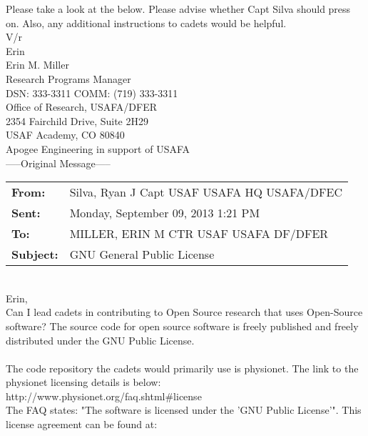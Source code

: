 \documentclass[10pt]{article}
\begin{document}
Please take a look at the below. Please advise whether Capt Silva should press on. Also, any additional instructions to cadets would be helpful. \\

V/r \\

Erin \\

\noindent Erin M. Miller \\
Research Programs Manager \\
DSN: 333-3311 COMM: (719) 333-3311 \\
Office of Research, USAFA/DFER \\
2354 Fairchild Drive, Suite 2H29 \\
USAF Academy, CO 80840 \\
Apogee Engineering in support of USAFA \\
\newpage
\noindent-----Original Message----- \\

\noindent \begin{tabu} to \textwidth{l X[l]}
 
  \textbf{From:} & Silva, Ryan J Capt USAF USAFA HQ USAFA/DFEC  \\
  \textbf{Sent:} & Monday, September 09, 2013 1:21 PM \\
  \textbf{To:} & MILLER, ERIN M CTR USAF USAFA DF/DFER \\
  \textbf{Subject:} & GNU General Public License \\
\end{tabu}
\hspace{0pt} \\

Erin, \\

Can I lead cadets in contributing to Open Source research that uses Open-Source software? The source code for open source software is freely published and freely distributed under the GNU Public License. \\
 \\
The code repository the cadets would primarily use is physionet. The link to the physionet licensing details is below: \\

http://www.physionet.org/faq.shtml\#license \\

\noindent The FAQ states: "The software is licensed under the 'GNU Public License'". This license agreement can be found at: \\
\end{document}
